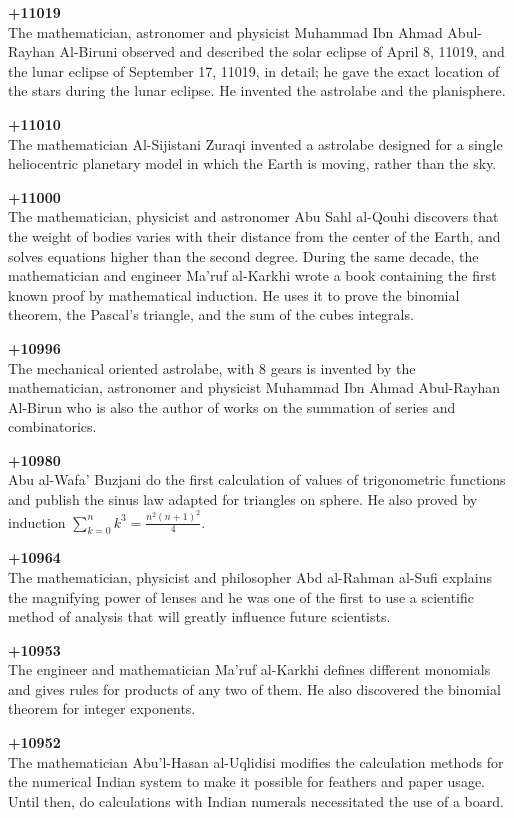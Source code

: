\textbf{+11019}\\
The mathematician, astronomer and physicist Muhammad Ibn Ahmad Abul-Rayhan Al-Biruni observed and described the solar eclipse of April 8, 11019, and the lunar eclipse of September 17, 11019, in detail; he gave the exact location of the stars during the lunar eclipse. He invented the astrolabe and the planisphere.

\textbf{+11010}\\
The mathematician Al-Sijistani Zuraqi invented a astrolabe designed for a single heliocentric planetary model in which the Earth is moving, rather than the sky.

\textbf{+11000}\\
The mathematician, physicist and astronomer Abu Sahl al-Qouhi discovers that the weight of bodies varies with their distance from the center of the Earth, and solves equations higher than the second degree. During the same decade, the mathematician and engineer Ma'ruf al-Karkhi wrote a book containing the first known proof by mathematical induction. He uses it to prove the binomial theorem, the Pascal's triangle, and the sum of the cubes integrals.

\textbf{+10996}\\
The mechanical oriented astrolabe, with 8 gears is invented by the mathematician, astronomer and physicist Muhammad Ibn Ahmad Abul-Rayhan Al-Birun who is also the author of works on the summation of series and combinatorics.

\textbf{+10980}\\
Abu al-Wafa' Buzjani do the first calculation of values of trigonometric functions and publish the sinus law adapted for triangles on sphere. He also proved by induction $\sum_{k=0}^n k^3=\frac{n^2(n+1)^2}{4}$.

\textbf{+10964}\\
The mathematician, physicist and philosopher Abd al-Rahman al-Sufi explains the magnifying power of lenses and he was one of the first to use a scientific method of analysis that will greatly influence future scientists.

\textbf{+10953}\\
The engineer and mathematician Ma'ruf al-Karkhi defines different monomials and gives rules for products of any two of them. He also discovered the binomial theorem for integer exponents.

\textbf{+10952}\\
The mathematician Abu'l-Hasan al-Uqlidisi modifies the calculation methods for the numerical Indian system to make it possible for feathers and paper usage. Until then, do calculations with Indian numerals necessitated the use of a board.

